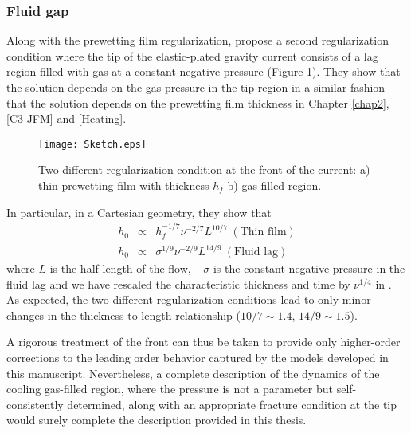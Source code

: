 \subsubsection*{Fluid gap}
\label{sec:fracturation}

Along      with      the     prewetting      film      regularization,
\citet{Anonymous:QWXp_4JV} propose  a second  regularization condition
where the tip of the elastic-plated  gravity current consists of a lag
region  filled  with  gas  at a  constant  negative  pressure  (Figure
\ref{C7-Sketch}).   They show  that the  solution depends  on the  gas
pressure in  the tip  region in  a similar  fashion that  the solution
depends  on  the prewetting  film  thickness  in Chapter  \ref{chap2},
\ref{C3-JFM} and \ref{Heating}.
\begin{figure}[h!]
 \begin{center}
 \graphicspath{ {/Users/thorey/Documents/These/Manuscript/Figure/Chapter7/} }
 \texttt{[image: Sketch.eps]}
 \caption{Two different  regularization condition at the  front of the
   current: a) thin prewetting film with thickness $h_f$ b) gas-filled
   region.}
 \label{C7-Sketch}
 \end{center}
\end{figure}
In particular, in a Cartesian geometry, they show that
\begin{eqnarray}
 h_0&\propto& h_f^{-1/7}\nu^{-2/7}L^{10/7}~(\text{Thin film})\\
 h_0&\propto& \sigma^{1/9}\nu^{-2/9}L^{14/9}~(\text{Fluid lag})
\end{eqnarray}
where $L$  is the half length  of the flow, $-\sigma$  is the constant
negative  pressure  in  the  fluid   lag  and  we  have  rescaled  the
characteristic    thickness    and     time    by    $\nu^{1/4}$    in
\citet{Anonymous:QWXp_4JV}.   As    expected,   the    two   different
regularization conditions lead  to only minor changes  in the thickness
to length relationship ($10/7\sim 1.4$, $14/9\sim 1.5 $).

A rigorous  treatment of the front  can thus be taken  to provide only
higher-order corrections to the leading order behavior captured by the
models  developed   in  this  manuscript.  Nevertheless,   a  complete
description of  the dynamics of  the cooling gas-filled  region, where
the  pressure is  not  a parameter  but self-consistently  determined,
along with an  appropriate fracture condition at the  tip would surely
complete the description provided in this thesis.


